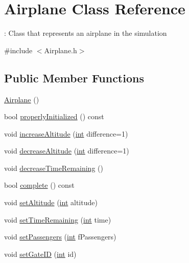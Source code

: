 \hypertarget{classAirplane}{}\section{Airplane Class Reference}
\label{classAirplane}


\+: Class that represents an airplane in the simulation  




{\ttfamily \#include $<$Airplane.\+h$>$}

\subsection*{Public Member Functions}
\begin{DoxyCompactItemize}
\item 
\hyperlink{classAirplane_afccae36e3013e038d51504cea1a98219}{Airplane} ()
\item 
bool \hyperlink{classAirplane_aa58418c017671c7b5de17c81a4172971}{properly\+Initialized} () const 
\item 
void \hyperlink{classAirplane_a5a1735c5e75f857a4de0a473c5e26ffe}{increase\+Altitude} (\hyperlink{CMakeCache_8txt_a79a3d8790b2588b09777910863574e09}{int} difference=1)
\item 
void \hyperlink{classAirplane_aed1d8b816a7140ba82223901fa7bb1d5}{decrease\+Altitude} (\hyperlink{CMakeCache_8txt_a79a3d8790b2588b09777910863574e09}{int} difference=1)
\item 
void \hyperlink{classAirplane_ac97a6ca10328e33558f682e0b45e5a60}{decrease\+Time\+Remaining} ()
\item 
bool \hyperlink{classAirplane_a44a6eac9309f6218c7e0c0332f25ee51}{complete} () const 
\item 
void \hyperlink{classAirplane_a60ea276094957364060f7b22bb6e549d}{set\+Altitude} (\hyperlink{CMakeCache_8txt_a79a3d8790b2588b09777910863574e09}{int} altitude)
\item 
void \hyperlink{classAirplane_a43e7b856df001168956ed6d115943ec9}{set\+Time\+Remaining} (\hyperlink{CMakeCache_8txt_a79a3d8790b2588b09777910863574e09}{int} time)
\item 
void \hyperlink{classAirplane_a1f8bcb214c96664d15d8c4d82c3f613a}{set\+Passengers} (\hyperlink{CMakeCache_8txt_a79a3d8790b2588b09777910863574e09}{int} f\+Passengers)
\item 
void \hyperlink{classAirplane_aed585c73c9dd5065bd1f8b55236260a0}{set\+Gate\+ID} (\hyperlink{CMakeCache_8txt_a79a3d8790b2588b09777910863574e09}{int} id)
\item 

\end{DoxyCompactItemize}
